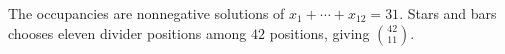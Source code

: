 The occupancies are nonnegative solutions of $x_1+\cdots+x_{12}=31$. Stars and bars chooses eleven divider positions among $42$ positions, giving $\boxed{\binom{42}{11}}$.

